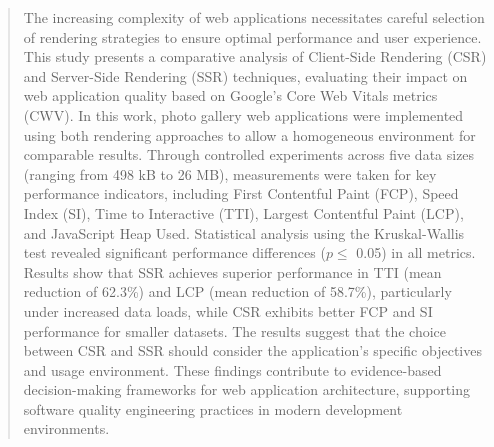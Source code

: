 \documentclass[sigconf]{acmart}
\begin{document}

\renewcommand\abstractname{ABSTRACT}
\renewcommand\keywordsname{KEYWORDS}
\renewcommand\refname{REFERENCES}

\begin{abstract}
The increasing complexity of web applications necessitates careful selection of rendering strategies to ensure optimal performance and user experience. This study presents a comparative analysis of Client-Side Rendering (CSR) and Server-Side Rendering (SSR) techniques, evaluating their impact on web application quality based on Google's Core Web Vitals metrics (CWV).  In this work, photo gallery web applications were implemented using both rendering approaches to allow a homogeneous environment for comparable results.
Through controlled experiments across five data sizes (ranging from 498 kB to 26 MB), measurements were taken for key performance indicators, including First Contentful Paint (FCP), Speed Index (SI), Time to Interactive (TTI), Largest Contentful Paint (LCP), and JavaScript Heap Used. Statistical analysis using the Kruskal-Wallis test revealed significant performance differences ($p \leq$ 0.05) in all metrics. Results show that SSR achieves superior performance in TTI (mean reduction of 62.3\%) and LCP (mean reduction of 58.7\%), particularly under increased data loads, while CSR exhibits better FCP and SI performance for smaller datasets. The results suggest that the choice between CSR and SSR should consider the application's specific objectives and usage environment. 
These findings contribute to evidence-based decision-making frameworks for web application architecture, supporting software quality engineering practices in modern development environments.
\end{abstract}

\end{document}
